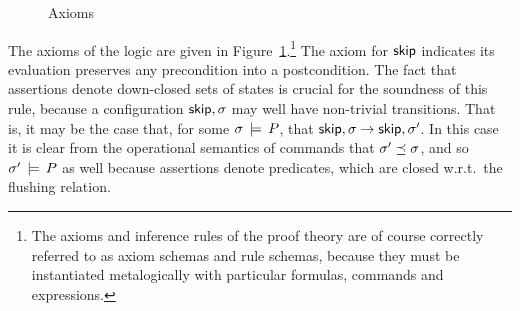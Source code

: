 \documentclass[11pt]{report}
\begin{document}
\begin{figure}[ht]
    \centering
    \caption{\label{fig:sequential-axioms}Axioms}
\end{figure}

The axioms of the logic are given in Figure~\ref{fig:sequential-axioms}.\footnote{The axioms and inference rules of the proof theory are of course correctly referred to as axiom schemas and rule schemas, because they must be instantiated metalogically with particular formulas, commands and expressions.} The axiom for $\operatorname{\mathsf{skip}}$ indicates its evaluation preserves any precondition into a postcondition. The fact that assertions denote down-closed sets of states is crucial for the soundness of this rule, because a configuration $\operatorname{\mathsf{skip}},\sigma$ may well have non-trivial transitions. That is, it may be the case that, for some $\sigma \,\models\, P$, that $\operatorname{\mathsf{skip}},\sigma \rightarrow \operatorname{\mathsf{skip}},\sigma'$. In this case it is clear from the operational semantics of commands that $\sigma' \preceq \sigma$, and so $\sigma' \,\models\, P$ as well because assertions denote predicates, which are closed w.r.t.\ the flushing relation. 
\end{document}

